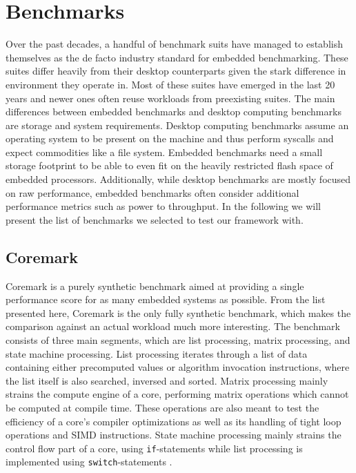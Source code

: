 \documentclass[../bachelor_paper.tex]{subfiles}
\begin{document}
\chapter{Benchmarks}
    \label{ch:bench}

Over the past decades, a handful of benchmark suits have managed to establish themselves as the de facto industry standard for embedded benchmarking. These suites differ heavily from their desktop counterparts given the stark difference in environment they operate in. Most of these suites have emerged in the last 20 years and newer ones often reuse workloads from preexisting suites. The main differences between embedded benchmarks and desktop computing benchmarks are storage and system requirements. Desktop computing benchmarks assume an operating system to be present on the machine and thus perform syscalls and expect commodities like a file system. Embedded benchmarks need a small storage footprint to be able to even fit on the heavily restricted flash space of embedded processors. Additionally, while desktop benchmarks are mostly focused on raw performance, embedded benchmarks often consider additional performance metrics such as power to throughput. In the following we will present the list of benchmarks we selected to test our framework with.

\section{Coremark}
Coremark is a purely synthetic benchmark aimed at providing a single performance score for as many embedded systems as possible. From the list presented here, Coremark is the only fully synthetic benchmark, which makes the comparison against an actual workload much more interesting. The benchmark consists of three main segments, which are list processing, matrix processing, and state machine processing. List processing iterates through a list of data containing either precomputed values or algorithm invocation instructions, where the list itself is also searched, inversed and sorted. Matrix processing mainly strains the compute engine of a core, performing matrix operations which cannot be computed at compile time. These operations are also meant to test the efficiency of a core's compiler optimizations as well as its handling of tight loop operations and \ac{SIMD} instructions. State machine processing mainly strains the control flow part of a core, using \texttt{if}-statements while list processing is implemented using \texttt{switch}-statements \cite{gal-onExploringCoremarkBenchmark2012}.
\end{document}
